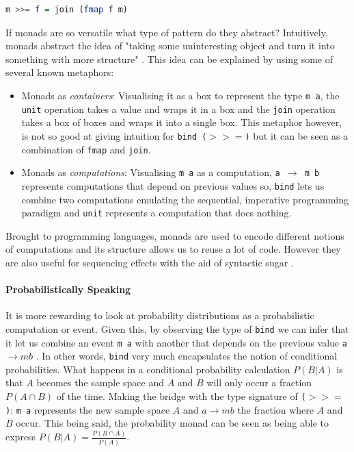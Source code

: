 \documentclass[
  oneside,
  11pt, a4paper,
  footinclude=true,
  headinclude=true,
  cleardoublepage=empty
]{scrbook}
\theoremstyle{definition}
\theoremstyle{definition}
\begin{document}
	            \begin{lstlisting}[mathescape, language=Haskell, caption={Relation between \texttt{join} and \texttt{bind}},captionpos=b]
	                    m >>= f = join (fmap f m) 
	            \end{lstlisting}{}
	            
	            If monads are so versatile what type of pattern do they abstract? Intuitively, monads abstract the idea of "taking some uninteresting object and turn it into something with more structure" \citep{DBLP:journals/corr/abs-1803-10195}. This idea can be explained by using some of several known metaphors:
	            
	            \begin{itemize}
	                \item Monads as \emph{containers}: Visualising it as a box to represent the type \texttt{m a}, the \texttt{unit} operation takes a value and wraps it in a box and the \texttt{join} operation takes a box of boxes and wraps it into a single box. This metaphor however, is not so good at giving intuition for \texttt{bind ($>>=$)} but it can be seen as a combination of \texttt{fmap} and \texttt{join}.
	                
	                \item Monads as \emph{computations}: Visualising \texttt{m a} as a computation, \texttt{a $\rightarrow$ m b} represents computations that depend on previous values so, \texttt{bind} lets us combine two computations emulating the sequential, imperative programming paradigm and \texttt{unit} represents a computation that does nothing.
	            \end{itemize}{}
	            
	            Brought to programming languages, monads are used to encode different notions of computations and its structure allows us to reuse a lot of code. However they are also useful for sequencing effects with the aid of syntactic sugar \citep{wiki:xxx}.
	        
	        \paragraph{Probabilistically Speaking}
	            
	It is more rewarding to look at probability distributions as a probabilistic computation or event. Given this, by observing the type of \texttt{bind} we can infer that it let us combine an event \texttt{m a} with another that depends on the previous value \texttt{a $\rightarrow m b$} \citep{erwig_kollmansberger_2006}. In other words, \texttt{bind} very much encapsulates the notion of conditional probabilities. What happens in a conditional probability calculation $P(B|A)$ is that $A$ becomes the sample space and $A$ and $B$ will only occur a fraction $P(A \cap B)$ of the time. Making the bridge with the type signature of \texttt{($>>=$)}: \texttt{m a} represents the new sample space $A$ and \texttt{$a \rightarrow m b$} the fraction where $A$ and $B$ occur. This being said, the probability monad can be seen as being able to express $P(B|A) = \frac{P(B \cap A)}{P(A)}$. 
	            
\end{document}
